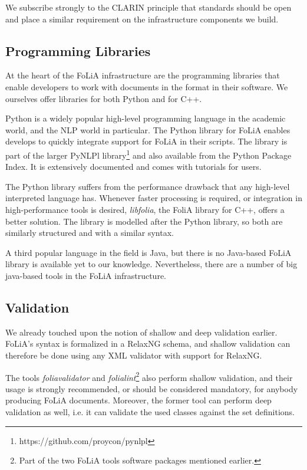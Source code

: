 We subscribe strongly to the CLARIN principle that standards should be open and
place a similar requirement on the infrastructure components we build. 

\subsection{Programming Libraries}

At the heart of the FoLiA infrastructure are the programming libraries that
enable developers to work with documents in the format in their software. We
ourselves offer libraries for both Python and for C++.

Python is a widely popular high-level programming language in the academic
world, and the NLP world in particular.  The Python library for FoLiA enables
develops to quickly integrate support for FoLiA in their scripts. The library
is part of the larger PyNLPl
library\footnote{https://github.com/proycon/pynlpl} and also available from the
Python Package Index. It is extensively documented and comes with tutorials for
users.

The Python library suffers from the performance drawback that any high-level
interpreted language has. Whenever faster processing is required, or
integration in high-performance tools is desired, \emph{libfolia}, the FoliA
library for C++, offers a better solution. The library is modelled after the
Python library, so both are similarly structured and with a similar syntax.

A third popular language in the field is Java, but there is no Java-based FoLiA
library is available yet to our knowledge. Nevertheless, there are a number of
big java-based tools in the FoLiA infrastructure.

\subsection{Validation}

We already touched upon the notion of shallow and deep validation earlier.
FoLiA's syntax is formalized in a RelaxNG schema, and shallow validation can
therefore be done using any XML validator with support for RelaxNG. 

The tools \emph{foliavalidator} and \emph{folialint}\footnote{Part of the two
FoLiA tools software packages mentioned earlier.} also perform shallow
validation, and their usage is strongly recommended, or should be considered
mandatory, for anybody producing FoLiA documents. Moreover, the former tool can
perform deep validation as well, i.e. it can validate the used classes against
the set definitions.

